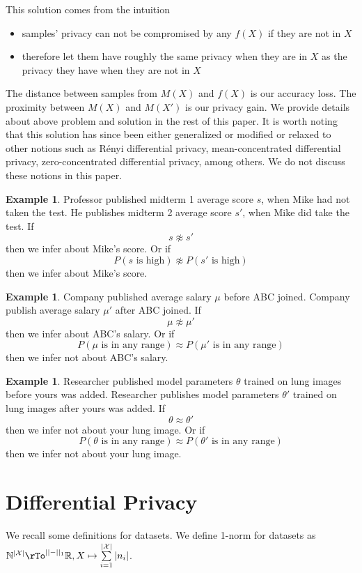 \documentclass[12pt]{amsart}
\theoremstyle{definition}
\newtheorem{example}[theorem]{Example}
\begin{document}
This solution comes from the intuition
\begin{itemize}
\item samples' privacy can not be compromised by any $f(X)$ if they are not in $X$
\item therefore let them have roughly the same privacy when they are in $X$ as the privacy they have when they are not in $X$
\end{itemize}

The distance between samples from $M(X)$ and $f(X)$ is our accuracy loss. The proximity between $M(X)$ and $M(X')$ is our privacy gain. We provide details about above problem and solution in the rest of this paper. It is worth noting that this solution has since been either generalized or modified or relaxed to other notions such as R\'enyi differential privacy, mean-concentrated differential privacy, zero-concentrated differential privacy, among others. We do not discuss these notions in this paper.

\begin{example} Professor published midterm 1 average score $s$, when Mike had not taken the test. He publishes midterm 2 average score $s'$, when Mike did take the test. If
$$ s \not\approx s'$$
then we infer about Mike's score. Or if
$$P(s \text{ is high}) \not\approx P(s' \text{ is high})$$
then we infer about Mike's score.
\end{example}

\begin{example} Company published average salary $\mu$ before ABC joined. Company publish average salary $\mu'$ after ABC joined. If
$$\mu \not\approx \mu'$$
then we infer about ABC's salary. Or if
$$P(\mu \text{ is in any range}) \approx P(\mu' \text{ is in any range})$$
then we infer not about ABC's salary.
\end{example}

\begin{example} Researcher published model parameters $\theta$ trained on lung images before yours was added. Researcher publishes model parameters $\theta'$ trained on lung images after yours was added. If
$$\theta \approx \theta'$$
then we infer not about your lung image. Or if
$$P(\theta \text{ is in any range}) \approx P(\theta' \text{ is in any range})$$
then we infer not about your lung image.
\end{example}

\section{Differential Privacy} We recall some definitions for datasets.
\dfn \label{1_norm} We define 1-norm for datasets as $\mathbb{N}^{|\mathcal{X}|} \rTo^{|| - ||_1} \mathbb{R}, X \mapsto \sum\limits_{i = 1}^{|\mathcal{X}|} |n_i|$.
\end{document}
